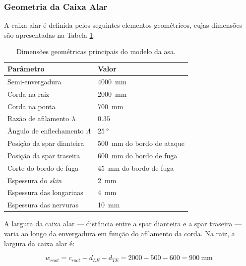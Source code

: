 \documentclass[a4paper,fleqn,noprintline]{cas-dc}
\begin{document}
\subsubsection{Geometria da Caixa Alar}

A caixa alar é definida pelos seguintes elementos geométricos, cujas dimensões são apresentadas na Tabela \ref{tab:geom_caixa_alar}:

\begin{table}[h!]
\centering
\caption{Dimensões geométricas principais do modelo da asa.}
\label{tab:geom_caixa_alar}
\renewcommand{\arraystretch}{1.4}
\begin{tabularx}{\textwidth}{p{5.5cm} X}
\toprule
\textbf{Parâmetro} & \textbf{Valor} \\
\midrule
Semi-envergadura                    & \SI{4000}{\milli\meter} \\
Corda na raiz                       & \SI{2000}{\milli\meter} \\
Corda na ponta                      & \SI{700}{\milli\meter}  \\
Razão de afilamento $\lambda$       & $0.35$ \\
Ângulo de enflechamento $\Lambda$   & $\qty{25}{\degree}$ \\
Posição da spar dianteira           & \SI{500}{\milli\meter} do bordo de ataque \\
Posição da spar traseira            & \SI{600}{\milli\meter} do bordo de fuga \\
Corte do bordo de fuga              & \SI{45}{\milli\meter} do bordo de fuga \\
Espessura do \textit{skin}          & \SI{2}{\milli\meter} \\
Espessura das longarinas            & \SI{4}{\milli\meter}\footnotemark \\
Espessura das nervuras              & \SI{10}{\milli\meter} \\
\bottomrule
\end{tabularx}
\end{table}

A largura da caixa alar --- distância entre a spar dianteira e a spar traseira --- varia ao longo da envergadura em função do afilamento da corda. Na raiz, a largura da caixa alar é:

\begin{equation}
    w_{root} = c_{root} - d_{LE} - d_{TE} = 
    2000 - 500 - 600 = \SI{900}{\milli\meter}
    \label{eq:largura_caixa_raiz}
\end{equation}
\end{document}
